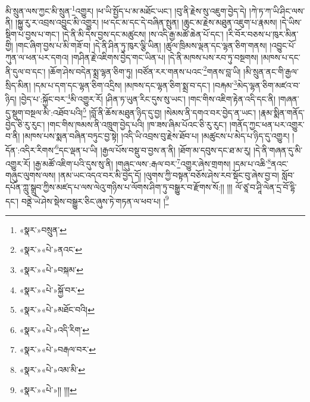 མི་སྲུན་ལས་ཀྱང་མི་སྲུན་\footnote{«སྣར་»བསྲུན་}འགྱུར། །ཕ་ཡི་སྤྱོད་པ་མ་མཐོང་ཡང་། །བུ་ནི་རྗེས་སུ་འཇུག་བྱེད་དེ། །ཀེ་ཏ་ཀ་ཡི་ཤིང་ལས་ནི། །སྐྱུ་རུ་ར་འབྲས་འབྱུང་མི་འགྱུར། །ཕ་དང་མ་དང་དེ་བཞིན་སྤུན། །ཆུང་མ་རྗེས་མཐུན་འཇུག་པ་རྣམས། །དེ་ཡིས་སྡིག་པ་བྱས་པ་གང་། །དེ་ནི་མི་དེས་བྱས་དང་མཚུངས། །ས་འདི་རྒྱ་མཚོ་ཆེན་པོ་དང་། །རི་བོར་བཅས་པ་ཁུར་མིན་གྱི། །གང་ཞིག་བྱས་པ་མི་གཟོ་བ། །དེ་ནི་ཤིན་ཏུ་ཁུར་ལྕི་ཡིན། །ཚུལ་ཁྲིམས་ལྡན་དང་ལྷན་ཅིག་གནས། །འབྱུང་པོ་ཀུན་ལ་ཕན་པར་དགའ། །གཤིན་རྗེ་འཇིགས་བྱེད་གང་ཡིན་པ། །དེ་ནི་མཁས་པས་རབ་ཏུ་བསྔགས། །མཁས་པ་དང་ནི་དུལ་བ་དང་། །ཆོག་ཤེས་བདེན་སྨྲ་ལྷན་ཅིག་ཏུ། །བཙོན་རར་གནས་པའང་\footnote{«སྣར་»«པེ་»ནའང་}གནས་བླ་ཡི། །མི་སྲུན་ནང་གི་རྒྱལ་སྲིད་མིན། །དམ་པ་དག་དང་ལྷན་ཅིག་འདྲིས། །མཁས་དང་ལྷན་ཅིག་སྨྲ་བ་དང་། །བརྐམ་\footnote{«སྣར་»«པེ་»བསྐམ་}མེད་ལྷན་ཅིག་མཛའ་བ་ཉིད། །བྱེད་པ་:སྐྱོང་བར་\footnote{«སྣར་»«པེ་»སྐྱོ་བར་}མི་འགྱུར་རོ། །ཤིན་ཏ་ཡུན་རིང་དུས་སུ་ཡང་། །གང་གིས་འཇིག་རྟེན་འདི་དང་ནི། །གཞན་དུ་སྡུག་བསྔལ་མི་:འཐོབ་པའི།\footnote{«སྣར་»«པེ་»མཐོང་བའི།} །བློ་ནི་ཆོས་མཐུན་ཉིད་དུ་བྱ། །སེམས་ནི་དགའ་བར་བྱེད་ན་ཡང་། །རྣམ་སྨིན་གནོད་བྱེད་ཅི་རུ་རུང་། །གང་གིས་ཁམས་ནི་འཁྲུག་བྱེད་པའི། །ཁ་ཟས་ཞིམ་པོའང་ཅི་རུ་རུང་། །གནོད་ཀྱང་ཕན་པར་འགྱུར་བ་ནི། །མཁས་པས་སྨན་བཞིན་བཏུང་བྱ་སྟེ། །འདི་ཡི་འབྲས་བུ་རྗེས་ཐོབ་པ། །མཚུངས་པ་མེད་པ་ཉིད་དུ་འགྱུར། །དོན་:འདིར་རིགས་\footnote{«སྣར་»«པེ་»འདི་རིག་}དང་ལྡན་པ་ཡི། །རྒྱལ་པོས་བསྡུ་བ་བྱས་ན་ནི། །ཐོག་མ་དབུས་དང་ཐ་མ་རུ། །དེ་ནི་གཞན་དུ་མི་འགྱུར་རོ། །རྒྱ་མཚོ་འཇིག་པའི་དུས་སུ་ནི། །གཞུང་ལས་:རྒལ་བར་\footnote{«སྣར་»«པེ་»བརྒལ་བར་}འགྱུར་ཞེས་གྲགས། །དམ་པ་འཆི་\footnote{«སྣར་»«པེ་»འམ་མི་}ནའང་གཞུང་ལུགས་ལས། །ནམ་ཡང་འདའ་བར་མི་བྱེད་དོ། །ལུགས་ཀྱི་བསྟན་བཅོས་ཤེས་རབ་སྡོང་བུ་ཞེས་བྱ་བ། སློབ་དཔོན་ཀླུ་སྒྲུབ་ཀྱིས་མཛད་པ་ལས་ལེའུ་གཉིས་པ་ལོགས་ཤིག་ཏུ་བསྒྱུར་བ་རྫོགས་སོ:།། །།། ལོ་ཙཱ་བ་ཤཱི་ལེན་དྲ་བོ་དྷི་དང་། བནྡེ་ཡེ་ཤེས་སྡེས་བསྒྱུར་ཅིང་ཞུས་ཏེ་གཏན་ལ་ཕབ་པ། །\footnote{«སྣར་»«པེ་»།། །།།}